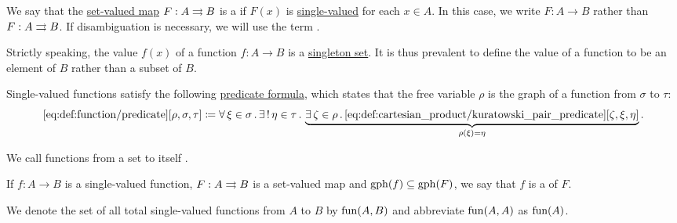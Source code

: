 \begin{definition}\label{def:function}
  We say that the \hyperref[def:function]{set-valued map} \( F: A \rightrightarrows B \) is a  if \( F(x) \) is \hyperref[def:set_valued_map/value]{single-valued} for each \( x \in A \). In this case, we write \( F: A \to B \) rather than \( F: A \rightrightarrows B \). If disambiguation is necessary, we will use the term .

  Strictly speaking, the value \( f(x) \) of a function \( f: A \to B \) is a \hyperref[rem:singleton_sets]{singleton set}. It is thus prevalent to define the value of a function to be an element of \( B \) rather than a subset of \( B \).

  Single-valued functions satisfy the following \hyperref[rem:predicate_formula]{predicate formula}, which states that the free variable \( \rho \) is the graph of a function from \( \sigma \) to \( \tau \):
  \begin{equation*}\taglabel[\op{IsFun}]{eq:def:function/predicate}
    \ref{eq:def:function/predicate}[\rho, \sigma, \tau] \coloneqq \qforall {\xi \in \sigma} \qExists {\eta \in \tau} \underbrace{ \qexists {\zeta \in \rho} \ref{eq:def:cartesian_product/kuratowski_pair_predicate}[\zeta, \xi, \eta] }_{\rho(\xi) = \eta}.
  \end{equation*}

  \begin{thmenum}
     We call functions from a set to itself .

    \medskip

     If \( f: A \to B \) is a single-valued function, \( F: A \rightrightarrows B \) is a set-valued map and \( \operatorname{gph}(f) \subseteq \operatorname{gph}(F) \), we say that \( f \) is a  of \( F \).

    \mimprovised We denote the set of all total single-valued functions from \( A \) to \( B \) by \( \operatorname{fun}(A, B) \) and abbreviate \( \operatorname{fun}(A, A) \) as \( \operatorname{fun}(A) \).
  \end{thmenum}
\end{definition}

